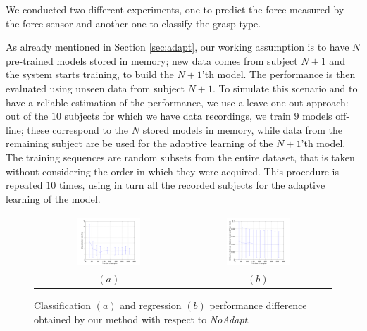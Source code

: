We conducted two different experiments, one to predict the force measured
by the force sensor and another one to classify the grasp type.

As already mentioned in Section \ref{sec:adapt}, our working
assumption is to have $N$ pre-trained models stored in memory; new
data comes from subject $N+1$ and the system starts training, to build
the $N+1$'th model. The performance is then evaluated using unseen
data from subject $N+1$. To simulate this scenario and to have a
reliable estimation of the performance, we use a leave-one-out
approach: out of the $10$ subjects for which we have data recordings,
we train $9$ models off-line; these correspond to the $N$ stored
models in memory, while data from the remaining subject are be used
for the adaptive learning of the $N+1$'th model. The training
sequences are random subsets from the entire dataset, that is taken
without considering the order in which they were acquired. This
procedure is repeated $10$ times, using in turn all the recorded
subjects for the adaptive learning of the model.

\begin{figure}[!ht] \centering
  \begin{tabular}{cc}
    \includegraphics[width=0.45\textwidth]{figs/exp1} &
    \includegraphics[width=0.45\textwidth]{figs/exp2} \\
    $(a)$ & $(b)$ \\
  \end{tabular}
  \caption{Classification $(a)$ and regression $(b)$ performance
    difference obtained by our method with respect to \emph{NoAdapt}.}
  \label{fig:diff_res}
\end{figure}

